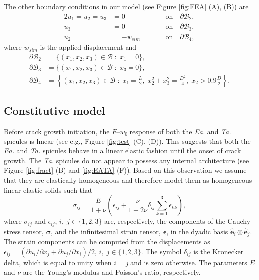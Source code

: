 \documentclass[12pt,onecolumn]{article}
\makeatletter
\newcommand{\ei}{{\bm{\hat{e}}}_i}
\newcommand{\ej}{{\bm{\hat{e}}}_j}
\newcommand{\TA}{\textit{Ta.\@}\xspace}
\newcommand{\EA}{\textit{Ea.\@}\xspace}
\makeatother
\begin{document}
\begin{bibunit}
The other boundary conditions in our model (see Figure \ref{fig:FEA} (A), (B)) are
%
\begin{alignat}{2}
    u_1=u_2=u_3&=0 \qquad&&\text{on}\quad \partial \mathcal{B}_2, \label{eq:BC2}\\
    u_3&=0 \qquad&&\text{on}\quad \partial \mathcal{B}_3,\label{eq:BC3}\\
    u_2&=-w_{sim} \qquad&&\text{on}\quad \partial \mathcal{B}_4,\label{eq:BC4}
\end{alignat}
%
where $w_{sim}$ is the applied displacement and
%
\begin{align}
    \partial\mathcal{B}_2&=\{(x_1,x_2,x_3) \in \mathcal{B} \; : \; x_1=0\},\\
    \partial\mathcal{B}_3&=\{(x_1,x_2,x_3) \in \mathcal{B} \; : \; x_3=0\},\\
    \partial\mathcal{B}_4&=\left\{(x_1,x_2,x_3) \in \mathcal{B} \; : \; x_1=\frac{L}{2}, \; x_2^2+x_3^2=\frac{D^2}{4}, \; x_2 >0.9 \frac{D}{2}\right\}.
\end{align}


\subsection{Constitutive model}
Before crack growth initiation, the $F$--$w_0$ response of both the \EA and \TA spicules is linear (see e.g., Figure \ref{fig:test} (C), (D)). This suggests that both the \EA and \TA spicules behave in a linear elastic fashion until the onset of crack growth.
%
The \TA spicules do not appear to possess any internal architecture (see Figure \ref{fig:fract} (B) and \ref{fig:EATA} (F)). Based on this observation we assume that they are elastically homogeneous and therefore model them as homogeneous linear elastic solids such that
%
\begin{equation}
\label{eq:LE}
    \sigma_{ij}=\frac{E}{1+\nu}\left(\epsilon_{ij}+\frac{\nu}{1-2\nu}\delta_{ij}\sum_{k=1}^{3}\epsilon_{kk}\right),
\end{equation}
%
where $\sigma_{ij}$ and $\epsilon_{ij}$, $i,\;j\in\{1,2,3\}$ are, respectively, the components of the Cauchy stress tensor, $\bm{\sigma}$, and the infinitesimal strain tensor, $\bm{\epsilon}$, in the dyadic basis $\ei \otimes \ej$. The strain components can be computed from the displacements as $\epsilon_{ij}=(\partial u_i/\partial x_j+\partial u_j/\partial x_i)/2$, $i,\;j\in\{1,2,3\}$. The symbol $\delta_{ij}$ is the Kronecker delta, which is equal to unity when $i=j$ and is zero otherwise. The parameters $E$ and $\nu$ are the Young's modulus and Poisson's ratio, respectively.



\end{bibunit}
\end{document}
